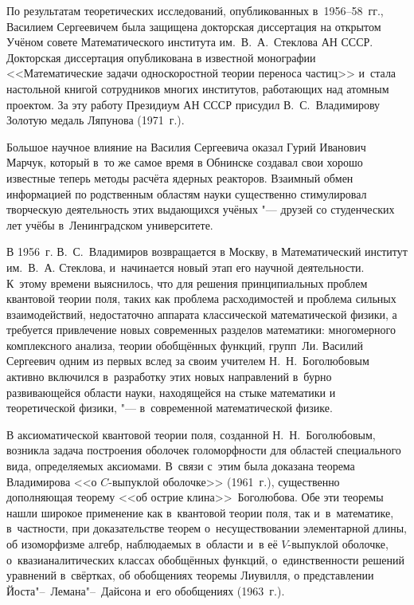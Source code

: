 По результатам теоретических исследований, опубликованных в~1956--58~гг., Василием Сергеевичем была защищена докторская диссертация на открытом Учёном совете Математического института им.~В.~А.~Стеклова АН СССР. Докторская диссертация опубликована в известной монографии <<Математические задачи односкоростной теории переноса частиц>> и~стала настольной книгой сотрудников многих институтов, работающих над атомным проектом. 
За эту работу Президиум АН СССР присудил В.~С.~Владимирову Золотую медаль Ляпунова (1971~г.).


Большое научное влияние на Василия Сергеевича оказал Гурий Иванович Марчук, который в~то же самое время в Обнинске создавал свои хорошо известные теперь методы расчёта ядерных реакторов. 
Взаимный обмен информацией по родственным областям науки существенно стимулировал творческую деятельность этих выдающихся учёных "--- друзей со студенческих лет учёбы в~Ленинградском университете.

В 1956~г. В.~С.~Владимиров возвращается в Москву, в Математический институт им.~В.~А. Стеклова, и~начинается новый этап его научной деятельности. 
К~этому времени выяснилось, что для решения принципиальных проблем квантовой теории поля, таких как проблема расходимостей и проблема сильных взаимодействий, недостаточно аппарата классической математической физики, а требуется привлечение новых современных разделов математики: многомерного комплексного анализа, теории обобщённых функций, групп~Ли. 
Василий Сергеевич одним из первых вслед за своим учителем Н.~Н.~Боголюбовым активно включился в~разработку этих новых направлений в~бурно развивающейся области науки, находящейся на стыке математики и теоретической физики, "--- в~современной математической физике.

В аксиоматической квантовой теории поля, созданной Н.~Н.~Боголюбовым, возникла задача построения оболочек голоморфности для областей специального вида, определяемых аксиомами. 
В~связи с~этим была доказана теорема Владимирова <<о $C$-выпуклой оболочке>> (1961~г.), существенно дополняющая теорему <<об острие клина>>~Боголюбова. 
Обе эти теоремы нашли широкое применение как в~квантовой теории поля, так и~в~математике, в~частности, при доказательстве теорем о~несуществовании элементарной длины, об изоморфизме алгебр, наблюдаемых в~области и~в её $V$-выпуклой оболочке, о~квазианалитических классах обобщённых функций, о~единственности решений уравнений в~свёртках, об обобщениях теоремы Лиувилля, о представлении Йоста"--~Лемана"--~Дайсона и~его обобщениях (1963~г.).


